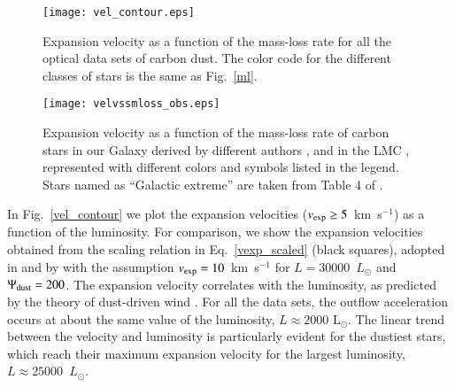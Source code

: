 \documentclass[useAMS,usenatbib]{mn2e/mn2e}
\begin{document}
{\begin{figure*}
\texttt{[image: vel\_contour.eps]}
        \caption{Expansion velocity as a function of the mass-loss rate for all the optical data sets of carbon dust. The color code for the different classes of stars is the same as Fig.~\ref{ml}.}
        \label{vel_mloss}
        \end{figure*}

        
        \begin{figure}
\texttt{[image: velvssmloss\_obs.eps]}
        \caption{Expansion velocity as a function of the mass-loss rate  of carbon stars in our Galaxy derived by different authors \citep[][Table 4]{Schoier01,Groenewegen02,RamstedtOlofsson_14, Danilovich_etal15, Groenewegen16}, and in the LMC \citep{Groenewegen16}, represented with different colors and symbols listed in the legend. Stars named as ``Galactic extreme'' are taken from Table 4 of \citet{Groenewegen16}.}
        \label{vel_mloss_data}
        \end{figure}

In Fig.~\ref{vel_contour} we plot the expansion velocities ($v_{\rm exp} \ge 5$~km~s$^{-1}$) as a function of the luminosity.
For comparison, we show the expansion velocities obtained from the scaling relation in Eq.~\ref{vexp_scaled} (black squares), adopted in \citet{Boyer12} and by \citet{Srinivasan16} with the assumption $v_{\rm exp}=10$~km~s$^{-1}$ for $L=30000$~$L_\odot$ and $\Psi_{\rm dust}=200$. 
The expansion velocity correlates with the luminosity, as predicted by the theory of dust-driven wind \citep{Elitzur01,Ivezic10}. 
For all the data sets, the outflow acceleration occurs at about the same value of the luminosity, $L\approx 2000$ L$_{\odot}$. The linear trend between the velocity and luminosity is particularly evident for the dustiest stars, which reach their maximum expansion velocity for the largest luminosity, $L\approx25000$~$L_{\odot}$.

}
\end{document}
